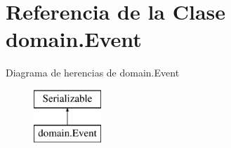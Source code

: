 \hypertarget{classdomain_1_1Event}{}\section{Referencia de la Clase domain.\+Event}
\label{classdomain_1_1Event}
Diagrama de herencias de domain.\+Event\begin{figure}[H]
\begin{center}
\leavevmode
\includegraphics[height=2.000000cm]{classdomain_1_1Event}
\end{center}
\end{figure}

